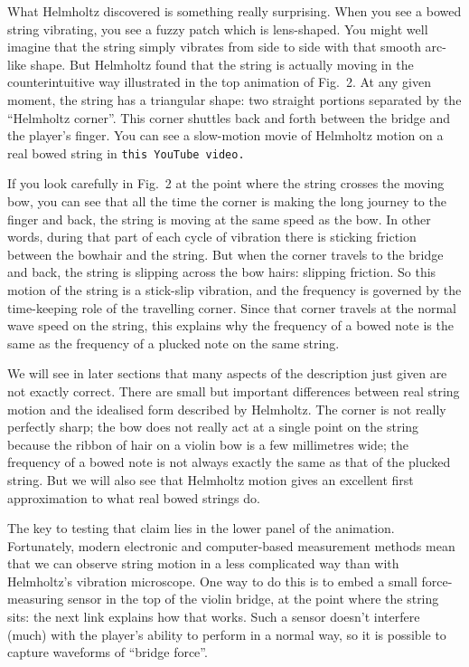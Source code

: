   What Helmholtz discovered is something really surprising. When you see a 
  bowed string vibrating, you see a fuzzy patch which is lens-shaped. You might 
  well imagine that the string simply vibrates from side to side with that 
  smooth arc-like shape. But Helmholtz found that the string is actually moving 
  in the counterintuitive way illustrated in the top animation of Fig.\ 2. At 
  any given moment, the string has a triangular shape: two straight portions 
  separated by the “Helmholtz corner”. This corner shuttles back and forth 
  between the bridge and the player’s finger. You can see a slow-motion movie 
  of Helmholtz motion on a real bowed string in \tt{}this YouTube video.\rm{} 

  If you look carefully in Fig.\ 2 at the point where the string crosses the 
  moving bow, you can see that all the time the corner is making the long 
  journey to the finger and back, the string is moving at the same speed as the 
  bow. In other words, during that part of each cycle of vibration there is 
  sticking friction between the bowhair and the string. But when the corner 
  travels to the bridge and back, the string is slipping across the bow hairs: 
  slipping friction. So this motion of the string is a stick-slip vibration, 
  and the frequency is governed by the time-keeping role of the travelling 
  corner. Since that corner travels at the normal wave speed on the string, 
  this explains why the frequency of a bowed note is the same as the frequency 
  of a plucked note on the same string. 

  We will see in later sections that many aspects of the description just given 
  are not exactly correct. There are small but important differences between 
  real string motion and the idealised form described by Helmholtz. The corner 
  is not really perfectly sharp; the bow does not really act at a single point 
  on the string because the ribbon of hair on a violin bow is a few millimetres 
  wide; the frequency of a bowed note is not always exactly the same as that of 
  the plucked string. But we will also see that Helmholtz motion gives an 
  excellent first approximation to what real bowed strings do. 

  The key to testing that claim lies in the lower panel of the animation. 
  Fortunately, modern electronic and computer-based measurement methods mean 
  that we can observe string motion in a less complicated way than with 
  Helmholtz’s vibration microscope. One way to do this is to embed a small 
  force-measuring sensor in the top of the violin bridge, at the point where 
  the string sits: the next link explains how that works. Such a sensor doesn’t 
  interfere (much) with the player’s ability to perform in a normal way, so it 
  is possible to capture waveforms of ``bridge force''. 


